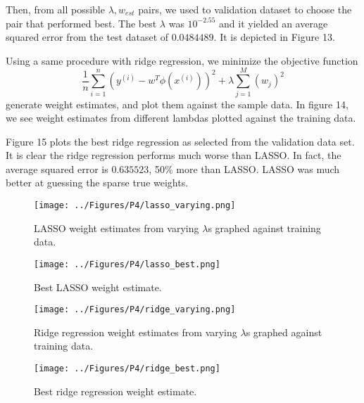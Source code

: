 \documentclass[a4paper,twoside]{article}
\begin{document}
Then, from all possible $\lambda, w_{est}$ pairs, we used to validation dataset to choose the pair that performed best. The best $\lambda$ was $10^{-2.55}$ and it yielded an average squared error from the test dataset of $0.0484489$. It is depicted in Figure 13.

Using a same procedure with ridge regression, we minimize the objective function
\begin{equation}
\frac{1}{n} \sum_{i=1}^{n} (y^{(i)} - w^T \phi(x^{(i)}))^2 + \lambda \sum_{j=1}^{M} (w_j)^2
\end{equation}
generate weight estimates, and plot them against the sample data. In figure 14, we see weight estimates from different lambdas plotted against the training data.

Figure 15 plots the best ridge regression as selected from the validation data set. It is clear the ridge regression performs much worse than LASSO. In fact, the average squared error is $0.635523$, 50\% more than LASSO. LASSO was much better at guessing the sparse true weights.

\begin{figure}[h]
  \texttt{[image: ../Figures/P4/lasso\_varying.png]}
  \caption{LASSO weight estimates from varying $\lambda$s graphed against training data.}
  \label{fig:lasso_varying}
\end{figure}

\begin{figure}[h]
  \texttt{[image: ../Figures/P4/lasso\_best.png]}
  \caption{Best LASSO weight estimate.}
  \label{fig:lasso_best}
\end{figure}

\begin{figure}[h]
  \texttt{[image: ../Figures/P4/ridge\_varying.png]}
  \caption{Ridge regression weight estimates from varying $\lambda$s graphed against training data.}
  \label{fig:ridge_varying}
\end{figure}

\begin{figure}[h]
  \texttt{[image: ../Figures/P4/ridge\_best.png]}
  \caption{Best ridge regression weight estimate.}
  \label{fig:ridge_best}
\end{figure}




\vfill
\end{document}
